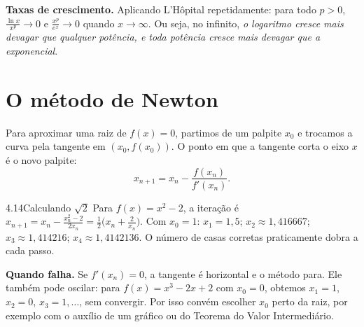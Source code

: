 \textbf{Taxas de crescimento.} Aplicando L'Hôpital repetidamente: para todo $p>0$,
$\frac{\ln x}{x^p}\to0$ e $\frac{x^p}{e^x}\to0$ quando $x\to\infty$. Ou seja, no infinito,
\emph{o logaritmo cresce mais devagar que qualquer potência, e toda potência cresce mais
devagar que a exponencial}.

\section{O método de Newton}

Para aproximar uma raiz de $f(x)=0$, partimos de um palpite $x_0$ e trocamos a curva pela
tangente em $(x_0,f(x_0))$. O ponto em que a tangente corta o eixo $x$ é o novo palpite:
\[
x_{n+1}=x_n-\frac{f(x_n)}{f'(x_n)} .
\]


\begin{exemplo}{4.14}{Calculando $\sqrt2$}
Para $f(x)=x^2-2$, a iteração é $x_{n+1}=x_n-\frac{x_n^2-2}{2x_n}=\frac12\Big(x_n+\frac2{x_n}\Big)$.
Com $x_0=1$: $x_1=1{,}5$; $x_2\approx1{,}416667$; $x_3\approx1{,}414216$; $x_4\approx1{,}4142136$.
O número de casas corretas praticamente dobra a cada passo.
\end{exemplo}

\textbf{Quando falha.} Se $f'(x_n)=0$, a tangente é horizontal e o método para. Ele também
pode oscilar: para $f(x)=x^3-2x+2$ com $x_0=0$, obtemos $x_1=1$, $x_2=0$, $x_3=1,\dots$, sem
convergir. Por isso convém escolher $x_0$ perto da raiz, por exemplo com o auxílio de um
gráfico ou do Teorema do Valor Intermediário.

